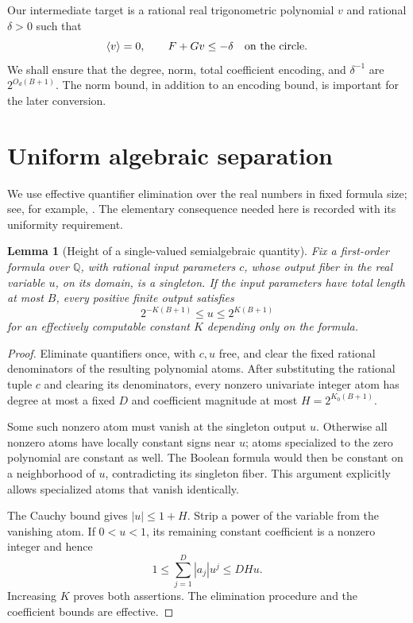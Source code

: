 \documentclass[11pt]{article}
\newtheorem{lemma}[theorem]{Lemma}
\theoremstyle{remark}\newtheorem{remark}[theorem]{Remark}
\newcommand{\Q}{\mathbb Q}
\newcommand{\mean}[1]{\left\langle #1\right\rangle}
\newcommand{\se}{2^{O_d(B+1)}}
\begin{document}
Our intermediate target is a rational real trigonometric polynomial \(v\) and rational \(\delta>0\) such that
\begin{equation}\label{eq:target}
 \mean v=0,\qquad F+Gv\leq-\delta
                  \quad\hbox{on the circle}.
\end{equation}
We shall ensure that the degree, norm, total coefficient encoding, and \(\delta^{-1}\) are \(\se\). The norm bound, in addition to an encoding bound, is important for the later conversion.

\section{Uniform algebraic separation}\label{sec:height}

We use effective quantifier elimination over the real numbers in fixed formula size; see, for example, \cite[Theorem 2.18]{Basu}. The elementary consequence needed here is recorded with its uniformity requirement.

\begin{lemma}[Height of a single-valued semialgebraic quantity]\label{lem:height}
Fix a first-order formula over \(\Q\), with rational input parameters \(c\), whose output fiber in the real variable \(u\), on its domain, is a singleton. If the input parameters have total length at most \(B\), every positive finite output satisfies
\[
                       2^{-K(B+1)}\leq u\leq2^{K(B+1)}
\]
for an effectively computable constant \(K\) depending only on the formula.
\end{lemma}

\begin{proof}
Eliminate quantifiers once, with \(c,u\) free, and clear the fixed rational denominators of the resulting polynomial atoms. After substituting the rational tuple \(c\) and clearing its denominators, every nonzero univariate integer atom has degree at most a fixed \(D\) and coefficient magnitude at most \(H=2^{K_0(B+1)}\).

Some such nonzero atom must vanish at the singleton output \(u\). Otherwise all nonzero atoms have locally constant signs near \(u\); atoms specialized to the zero polynomial are constant as well. The Boolean formula would then be constant on a neighborhood of \(u\), contradicting its singleton fiber. This argument explicitly allows specialized atoms that vanish identically.

The Cauchy bound gives \(|u|\leq1+H\). Strip a power of the variable from the vanishing atom. If \(0<u<1\), its remaining constant coefficient is a nonzero integer and hence
\[
 1\leq\sum_{j=1}^D |a_j|u^j\leq DHu.
\]
Increasing \(K\) proves both assertions. The elimination procedure and the coefficient bounds are effective.
\end{proof}
\end{document}
